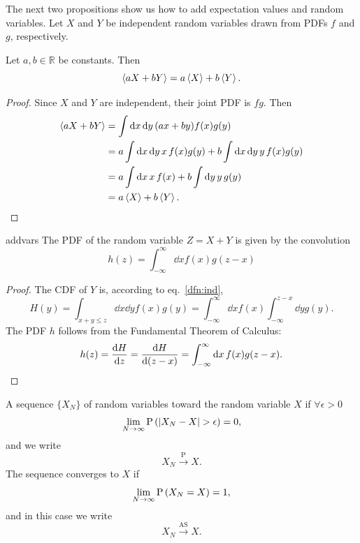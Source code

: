 The next two propositions show us how to add expectation values and
random variables. Let $X$ and $Y$ be independent random variables 
drawn from PDFs $f$ and $g$, respectively.
\begin{proposition}{}{}
  Let $a,b\in\mathbb{R}$ be constants. Then
  $$\ev{aX+bY}=a\ev{X}+b\ev{Y}.$$
  \begin{proof}
    Since $X$ and $Y$ are independent, their joint PDF is $fg$. Then
    \begin{equation*}
      \begin{aligned}
      \ev{aX+bY}&=\int\dd{x}\dd{y}(ax+by)f(x)g(y)\\
                &=a\int\dd{x}\dd{y}x\,f(x)g(y)+
                 b\int\dd{x}\dd{y}y\,f(x)g(y)\\
                &=a\int\dd{x}x\,f(x)+b\int\dd{y}y\,g(y)\\
                &=a\ev{X}+b\ev{Y}.
      \end{aligned}
    \end{equation*}
  \end{proof}
\end{proposition}

\begin{proposition}{}{addvars}
  The PDF of the random variable $Z=X+Y$ is given by the convolution
  \begin{equation*}
    h(z)=\int_{-\infty}^\infty\dd{x}f(x)g(z-x)
  \end{equation*}
  \begin{proof}
    The CDF of $Y$ is, according to eq.~\eqref{dfn:ind},
    \begin{equation*}
      H(y)=\int_{x+y\leq z}\dd{x}\dd{y}f(x)g(y)
          =\int_{-\infty}^\infty\dd{x}f(x)\int_{-\infty}^{z-x}
            \dd{y}g(y).
    \end{equation*}
    The PDF $h$ follows from the Fundamental Theorem of Calculus:
    \begin{equation*}
      h(z)=\dv{H}{z}=\dv{H}{(z-x)}
          =\int_{-\infty}^\infty\dd{x}f(x)g(z-x).
    \end{equation*}
  \end{proof}
\end{proposition}

A sequence $\{X_N\}$ of random variables 
toward the random variable $X$ if $\forall\epsilon>0$ 
\begin{equation}
  \lim_{N\to\infty}\pr{|X_N-X|>\epsilon}=0,
\end{equation}
and we write
\begin{equation}
  X_N\xrightarrow{\text{P}}X.
\end{equation}
The sequence converges to $X$ 
 if
\begin{equation}
  \lim_{N\to\infty}\operatorname{P}\left(X_N=X\right)=1,
\end{equation}
and in this case we write
\begin{equation}
  X_N\xrightarrow{\text{AS}}X.
\end{equation}


